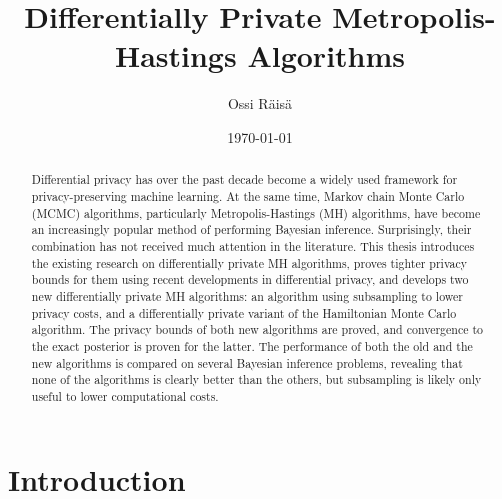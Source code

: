 \documentclass[english,twoside,openright]{HYgraduMLDS}
\title{Differentially Private Metropolis-Hastings Algorithms}
\author{Ossi Räisä}
\date{\today}
\begin{document}
\maketitle


\begin{abstract}
  Differential privacy has over the past decade become a widely used framework
  for privacy-preserving machine learning. At the same time,
  Markov chain Monte Carlo (MCMC) algorithms, particularly Metropolis-Hastings (MH)
  algorithms, have become an increasingly popular method
  of performing Bayesian inference. Surprisingly, their combination has not
  received much attention in the literature. This thesis introduces the
  existing research on differentially private MH algorithms, proves tighter
  privacy bounds for them using recent developments in differential privacy, and
  develops two new differentially private MH algorithms:
  an algorithm using subsampling to lower privacy costs, and
  a differentially private variant of the Hamiltonian Monte
  Carlo algorithm. The privacy bounds of both new algorithms are proved, and
  convergence to the exact posterior is proven for the latter.
  The performance of both the old and the new algorithms is compared on several
  Bayesian inference problems, revealing that none of the algorithms is
  clearly better than the others, but subsampling is likely only useful to lower
  computational costs.
\end{abstract}

\mytableofcontents

\mynomenclature

\chapter{Introduction}
\end{document}
